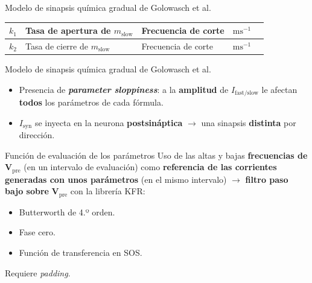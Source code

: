 \documentclass[10pt, aspectratio=169]{beamer}
\begin{document}
\begin{frame}{Modelo de sinapsis química gradual de Golowasch et al.}
\begin{tabular}{|l|>{\raggedright\arraybackslash}m{3.8cm}|>{\raggedright\arraybackslash}m{2.6cm}|l|l|}
        \hline
        \rowcolor{azulclaro}
        $k_1$                    & Tasa de apertura de $m_{\mathrm{slow}}$                                                                                              & Frecuencia de corte                                                  & $\mathrm{\text{ms}}^{-1}$ &                                                                       \\
        \hline
        $k_2$                    & Tasa de cierre de $m_{\mathrm{slow}}$                                                                                                & Frecuencia de corte                                                  & $\mathrm{\text{ms}}^{-1}$ &                                                                       \\
        \hline
    \end{tabular}
\end{frame}


\begin{frame}{Modelo de sinapsis química gradual de Golowasch et al.}
    \begin{itemize}
        \item Presencia de \textbf{\textit{parameter sloppiness}}: a la \textbf{amplitud} de $I_{\mathrm{fast/slow}}$ le afectan \textbf{todos} los parámetros de cada fórmula.
              \vspace{1.5em}
        \item $I_{\mathrm{syn}}$ se inyecta en la neurona \textbf{postsináptica} $\to$ una sinapsis \textbf{distinta} por dirección.
    \end{itemize}
\end{frame}






\begin{frame}{Función de evaluación de los parámetros}
    \small
    Uso de las altas y bajas \textbf{frecuencias de} $\boldsymbol{V_{\mathrm{pre}}}$ (en un intervalo de evaluación) como \textbf{referencia de las corrientes generadas con unos parámetros} (en el mismo intervalo) $\to$ \textbf{filtro paso bajo sobre} $\boldsymbol{V_{\mathrm{pre}}}$ con la librería KFR:
    \begin{itemize}
        \item Butterworth de 4.º orden.
        \item Fase cero.
        \item Función de transferencia en SOS.
    \end{itemize}
    Requiere \textit{padding}.
\end{frame}
\end{document}
